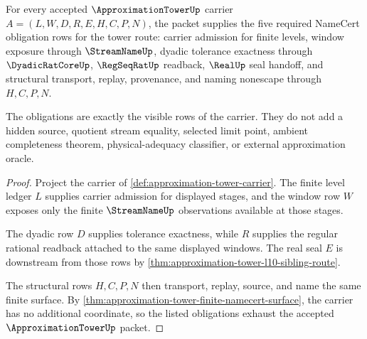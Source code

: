 \begin{theorem}
\label{thm:approximation-tower-obligation-closure}
For every accepted $\ApproximationTowerUp$ carrier $A=(L,W,D,R,E,H,C,P,N)$, the packet supplies the five required NameCert obligation rows for the tower route: carrier admission for finite levels, window exposure through $\StreamNameUp$, dyadic tolerance exactness through $\DyadicRatCoreUp$, $\RegSeqRatUp$ readback, $\RealUp$ seal handoff, and structural transport, replay, provenance, and naming nonescape through $H,C,P,N$.

The obligations are exactly the visible rows of the carrier. They do not add a hidden source, quotient stream equality, selected limit point, ambient completeness theorem, physical-adequacy classifier, or external approximation oracle.
\end{theorem}
\begin{proof}
Project the carrier of \autoref{def:approximation-tower-carrier}. The finite level ledger $L$ supplies carrier admission for displayed stages, and the window row $W$ exposes only the finite $\StreamNameUp$ observations available at those stages.

The dyadic row $D$ supplies tolerance exactness, while $R$ supplies the regular rational readback attached to the same displayed windows. The real seal $E$ is downstream from those rows by \autoref{thm:approximation-tower-l10-sibling-route}.

The structural rows $H,C,P,N$ then transport, replay, source, and name the same finite surface. By \autoref{thm:approximation-tower-finite-namecert-surface}, the carrier has no additional coordinate, so the listed obligations exhaust the accepted $\ApproximationTowerUp$ packet.
\end{proof}




